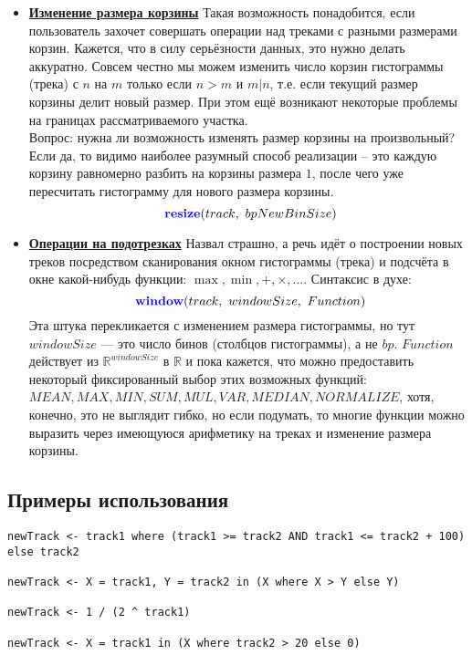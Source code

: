 \begin{itemize}
	\item \textbf{\underline{Изменение размера корзины}} Такая возможность понадобится, если пользователь захочет совершать операции над треками с разными размерами корзин. Кажется, что в силу серьёзности данных, это нужно делать аккуратно. Совсем честно мы можем изменить число корзин гистограммы (трека) с $n$ на $m$ только если $n > m$ и $m | n$, т.е. если текущий размер корзины делит новый размер. При этом ещё возникают некоторые проблемы на границах рассматриваемого участка.\\
	Вопрос: нужна ли возможность изменять размер корзины на произвольный? Если да, то видимо наиболее разумный способ реализации -- это каждую корзину равномерно разбить на корзины размера $1$, после чего уже пересчитать гистограмму для нового размера корзины.
	\[
		\kw { resize}(track,\ bpNewBinSize) 
	\]
	\item \textbf{\underline{Операции на подотрезках}} Назвал страшно, а речь идёт о построении новых треков посредством сканирования окном гистограммы (трека) и подсчёта в окне какой-нибудь функции: $\max, \min, +, \times, \ldots$. Синтаксис в духе:
	\[
		\kw { window}(track,\ windowSize,\ Function) 
	\]
	Эта штука перекликается с изменением размера гистограммы, но тут $windowSize$ --- это число бинов (столбцов гистограммы), а не $bp$.
	$Function$ действует из $\mathbb{R}^{windowSize}$ в $\mathbb{R}$ и пока кажется, что можно предоставить некоторый фиксированный выбор этих возможных функций: $MEAN, MAX, MIN, SUM, MUL, VAR, MEDIAN, NORMALIZE$, хотя, конечно, это не выглядит гибко, но если подумать, то многие функции можно выразить через имеющуюся арифметику на треках и изменение размера корзины.
\end{itemize}

\subsection*{Примеры использования}
\begin{lstlisting}
newTrack <- track1 where (track1 >= track2 AND track1 <= track2 + 100) else track2

newTrack <- X = track1, Y = track2 in (X where X > Y else Y)

newTrack <- 1 / (2 ^ track1)

newTrack <- X = track1 in (X where track2 > 20 else 0)
\end{lstlisting}

